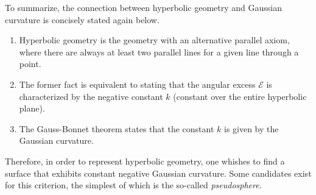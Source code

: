 To summarize, the connection between hyperbolic geometry and Gaussian curvature is concisely stated again below.
\begin{enumerate}
    \item Hyperbolic geometry is the geometry with an alternative parallel axiom, where there are always at least two parallel lines for a given line through a point.
    \item The former fact is equivalent to stating that the angular excess \(\mathscr{E}\) is characterized by the negative constant \(k\) (constant over the entire hyperbolic plane).
    \item The Gauss-Bonnet theorem states that the constant \(k\) is given by the Gaussian curvature.
\end{enumerate}
Therefore, in order to represent hyperbolic geometry, one whishes to find a surface that exhibits constant negative Gaussian curvature. Some candidates exist for this criterion, the simplest of which is the so-called \emph{pseudosphere}.

